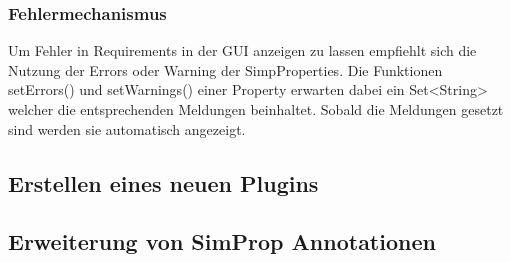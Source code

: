 \documentclass[a4paper, 11pt]{article} %
\begin{document}
\subsubsection{Fehlermechanismus}
Um Fehler in Requirements in der GUI anzeigen zu lassen empfiehlt sich die Nutzung der Errors oder Warning der SimpProperties. Die Funktionen setErrors() und setWarnings() einer Property erwarten dabei ein Set<String> welcher die entsprechenden Meldungen beinhaltet. Sobald die Meldungen gesetzt sind werden sie automatisch angezeigt. 


\subsection{Erstellen eines neuen Plugins} %
\label{sub:neues_plugin}

\subsection{Erweiterung von SimProp Annotationen} %
\label{sub:erweiterung_von_simulation_property_annotationen}







\end{document}
